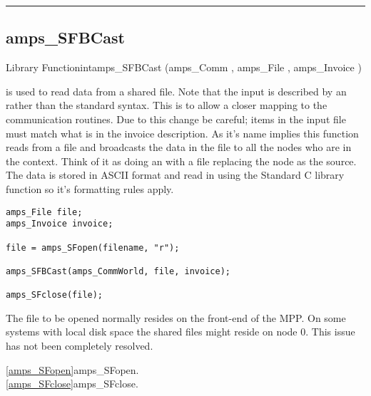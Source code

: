 \noindent\rule{\textwidth}{1mm}

\subsection{amps\_SFBCast}
\label{amps_SFBCast}


\begin{deftypefn}{Library Function}{int}{amps\_SFBCast}
(amps_Comm  , amps_File  , amps_Invoice ) 

\DESCRIPTION

 is used to read data from a shared file.  Note
that the input is described by an  rather than the
standard  syntax.  This is to allow a closer mapping to
the communication routines.  Due to this change be careful; items in
the input file must match what is in the invoice description.  As it's
name implies this function reads from a file and broadcasts the data
in the file to all the nodes who are in the  context.  Think
of it as doing an  with a file replacing the node as
the source.  The data is stored in ASCII format and read in using
the Standard C library function  so it's formatting rules
apply.

\EXAMPLE
\begin{display}\begin{verbatim}
amps_File file;
amps_Invoice invoice;

file = amps_SFopen(filename, "r");

amps_SFBCast(amps_CommWorld, file, invoice);

amps_SFclose(file);
\end{verbatim}\end{display}

\NOTES
The file to be opened normally resides on the front-end of the MPP.  On
some systems with local disk space the shared files might reside on node
0.  This issue has not been completely resolved.

\SEEALSO
\vref{amps_SFopen}{amps\_SFopen}. \\
\vref{amps_SFclose}{amps\_SFclose}. \\

\end{deftypefn}

